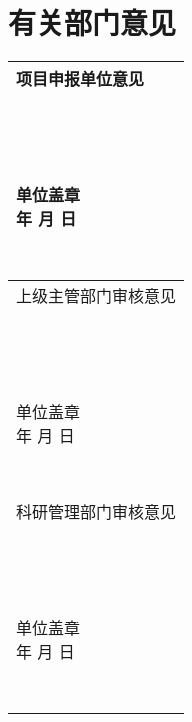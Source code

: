 



\section{有关部门意见}

\def\arraystretch{7.0}
{\kai
\begin{tabular}{|p{16.1cm}|}
	 \hline
\makecell[l]{项目申报单位意见 \\
	\\
	\\
	\\
	\\
	\quad\quad\quad\quad\quad\quad\quad\quad\quad\quad\quad\quad\quad\quad\quad\quad\quad\quad\quad\quad\quad\quad\quad\quad\quad\quad\quad\quad\quad 单位盖章 \\
	\quad\quad\quad\quad\quad\quad\quad\quad\quad\quad\quad\quad\quad\quad\quad\quad\quad\quad\quad\quad\quad\quad\quad\quad\quad\quad\quad\quad\quad  年   \quad 月  \quad  日 \\
	\\ \\ 
} \\ \hline

\makecell[l]{上级主管部门审核意见 \\
	\\
	\\
	\\
	\\
	\quad\quad\quad\quad\quad\quad\quad\quad\quad\quad\quad\quad\quad\quad\quad\quad\quad\quad\quad\quad\quad\quad\quad\quad\quad\quad\quad\quad\quad 单位盖章 \\
	\quad\quad\quad\quad\quad\quad\quad\quad\quad\quad\quad\quad\quad\quad\quad\quad\quad\quad\quad\quad\quad\quad\quad\quad\quad\quad\quad\quad\quad  年   \quad 月  \quad  日 \\
	\\ \\
} \\ \hline
\makecell[l]{科研管理部门审核意见 \\
	\\
	\\
	\\
	\\
	\quad\quad\quad\quad\quad\quad\quad\quad\quad\quad\quad\quad\quad\quad\quad\quad\quad\quad\quad\quad\quad\quad\quad\quad\quad\quad\quad\quad\quad 单位盖章 \\
	\quad\quad\quad\quad\quad\quad\quad\quad\quad\quad\quad\quad\quad\quad\quad\quad\quad\quad\quad\quad\quad\quad\quad\quad\quad\quad\quad\quad\quad  年   \quad 月  \quad  日 \\
	\\ \\ 
} \\ \hline
\end{tabular}
}

